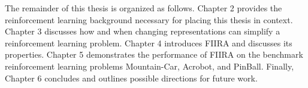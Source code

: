 The remainder of this thesis is organized as follows.
Chapter 2 provides the reinforcement learning background necessary for
placing this thesis in context.
Chapter 3 discusses how and when changing representations can simplify a
reinforcement learning problem.
Chapter 4 introduces FIIRA and discusses its properties.
Chapter 5 demonstrates the performance of FIIRA on the benchmark
reinforcement learning problems Mountain-Car, Acrobot, and PinBall.
Finally, Chapter 6 concludes and outlines possible directions for future work.
